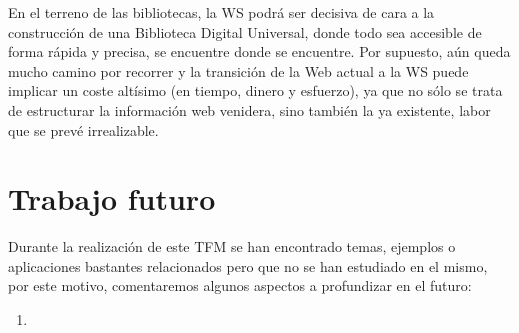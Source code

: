 En el terreno de las bibliotecas, la WS podrá ser decisiva de cara a la construcción de una Biblioteca Digital Universal, donde todo sea accesible de forma rápida y precisa, se encuentre donde se encuentre. Por supuesto, aún queda mucho camino por recorrer y la transición de la Web actual a la WS puede implicar un coste altísimo (en tiempo, dinero y esfuerzo), ya que no sólo se trata de estructurar la información web venidera, sino también la ya existente, labor que se prevé irrealizable.

\section{Trabajo futuro}

Durante la realización de este TFM se han encontrado temas, ejemplos o aplicaciones bastantes relacionados pero que no se han estudiado en el mismo, por este motivo, comentaremos algunos aspectos a profundizar en el futuro:

\begin{enumerate}
	
	\item 
	
\end{enumerate}




